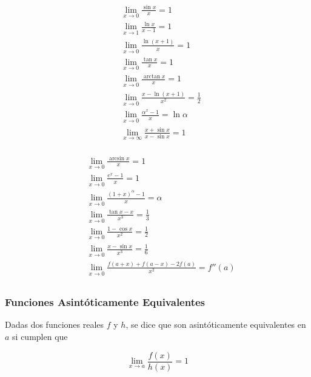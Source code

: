 \begin{minipage}{0.55\textwidth}
\begin{equation}
\begin{split}
    & \lim_{x\to 0}\frac{\sin{x}}{x} = 1 \\
    & \lim_{x\to 1}\frac{\ln{x}}{x-1} = 1\\
    & \lim_{x\to 0}\frac{\ln{(x+1)}}{x} = 1\\
    & \lim_{x\to 0}\frac{\tan{x}}{x} = 1\\
    & \lim_{x\to 0}\frac{\arctan{x}}{x} = 1\\
    & \lim_{x\to 0}\frac{x-\ln{(x+1)}}{x^2} = \frac{1}{2}\\
    & \lim_{x\to 0}\frac{\alpha^x-1}{x} = \ln{\alpha}\\
    & \lim_{x\to\infty}\frac{x+\sin{x}}{x-\sin{x}} = 1\\
\end{split}
\nonumber
\end{equation}
\end{minipage}
\begin{minipage}{0.55\textwidth}
\begin{equation}
\begin{split}
    & \lim_{x\to 0}\frac{\arcsin{x}}{x} = 1\\
    & \lim_{x\to 0}\frac{e^x-1}{x} = 1\\
    & \lim_{x\to 0}\frac{(1+x)^{\alpha}-1}{x} = \alpha\\
    & \lim_{x\to 0}\frac{\tan{x}-x}{x^3} = \frac{1}{3}\\
    & \lim_{x\to 0}\frac{1-\cos{x}}{x^2} = \frac{1}{2}\\
    & \lim_{x\to 0}\frac{x-\sin{x}}{x^3} = \frac{1}{6}\\
    & \lim_{x\to 0}\frac{f(a+x)+f(a-x)-2f(a)}{x^2} = f''(a)\\
\end{split}
\nonumber
\end{equation}
\end{minipage}

\subsubsection{Funciones Asintóticamente Equivalentes}

Dadas dos funciones reales $f$ y $h$, se dice que son asintóticamente equivalentes en $a$ si cumplen que

\[\lim_{x\to a}\frac{f(x)}{h(x)} = 1\]


